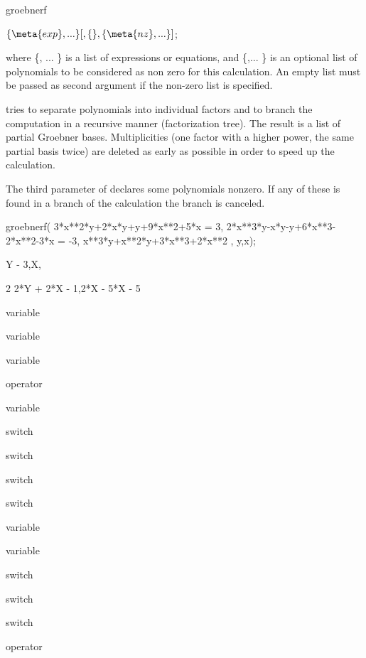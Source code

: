 \begin{Operator}{groebnerf}
\begin{Syntax}

\(\{\meta{exp}, ...\}[,\{\},\{\meta{nz}, ... \}]\);

\end{Syntax}
where \{, ... \} is a list of expressions or
equations, and \{,... \} is
an optional list of polynomials to be considered as non zero
for this calculation. An empty list must be passed as second argument
if the non-zero list is specified.


 tries to separate polynomials into individual factors and
to branch the computation in a recursive manner (factorization tree).
The result is a list of partial Groebner bases. 
Multiplicities (one factor with a higher power, the same partial basis
twice) are deleted as early as possible in order to speed up the
calculation. 

The third parameter of  declares some polynomials
nonzero. If any of these is found in a branch of the calculation
the branch is canceled. 

\begin{Bigexample}
groebnerf({ 3*x**2*y+2*x*y+y+9*x**2+5*x = 3,  
            2*x**3*y-x*y-y+6*x**3-2*x**2-3*x = -3, 
            x**3*y+x**2*y+3*x**3+2*x**2 }, {y,x});

       {{Y - 3,X},

                      2
    {2*Y + 2*X - 1,2*X  - 5*X - 5}}
\end{Bigexample}

\begin{Related}
\item[ \nameref{groebresmax} variable]
\item[ \nameref{groebmonfac} variable]
\item[ \nameref{groebrestriction} variable]
\item[ \nameref{groebner} operator]
\item[ \nameref{gvarslast} variable]
\item[ \nameref{groebopt} switch]
\item[ \nameref{groebprereduce} switch]
\item[ \nameref{groebfullreduction} switch]
\item[ \nameref{gltbasis} switch]
\item[ \nameref{gltb} variable]
\item[ \nameref{glterms} variable]
\item[ \nameref{groebstat} switch]
\item[ \nameref{trgroeb} switch]
\item[ \nameref{trgroebs} switch]
\item[ \nameref{groebnert} operator]
\end{Related}

\end{Operator}

